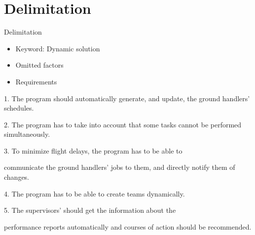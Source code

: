 \section{Delimitation}
\begin{frame}{Delimitation}
    \begin{itemize}
        \item{Keyword: Dynamic solution}
        \item{Omitted factors}
        \item{Requirements}
    \end{itemize}

    \centerline{\tiny 1. The program should automatically generate, and update, the ground handlers' schedules.}
    \centerline{\tiny 2. The program has to take into account that some tasks cannot be performed simultaneously.}
    \centerline{\tiny 3. To minimize flight delays, the program has to be able to}
    \centerline{\tiny communicate the ground handlers' jobs to them, and directly notify them of changes.}
    \centerline{\tiny 4. The program has to be able to create teams dynamically.}
    \centerline{\tiny 5. The supervisors' should get the information about the}
    \centerline{\tiny performance reports automatically and courses of action should be recommended.}

\end{frame}